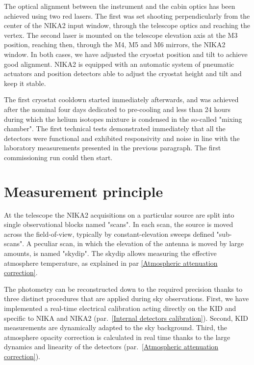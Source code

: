 \documentclass[]{aa} %
\begin{document}
The optical alignment between the instrument and the cabin optics has been
achieved using two red lasers. The first was set shooting perpendicularly from
the center of the NIKA2 input window, through the telescope optics and reaching
the vertex. The second laser is mounted on the telescope elevation axis at the
M3 position, reaching then, through the M4, M5 and M6 mirrors, the NIKA2
window. In both cases, we have adjusted the cryostat position and tilt to
achieve good alignment. NIKA2 is equipped with an automatic system of pneumatic
actuators and position detectors able to adjust the cryostat height and tilt and
keep it stable.

The first cryostat cooldown started immediately afterwards, and was achieved
after the nominal four days dedicated to pre-cooling and less than 24 hours
during which the helium isotopes mixture is condensed in the so-called "mixing
chamber". The first technical tests demonstrated immediately that all the
detectors were functional and exhibited responsivity and noise in line with the
laboratory measurements presented in the previous paragraph. The first
commissioning run could then start.







\section{Measurement principle}

At the telescope the NIKA2 acquisitions on a particular source are split into
single observational blocks named "scans". In each scan, the source is moved
across the field-of-view, typically by constant-elevation sweeps defined
"sub-scans". A peculiar scan, in which the elevation of the antenna is moved by
large amounts, is named "skydip". The skydip allows measuring the effective
atmosphere temperature, as explained in par \ref{Atmospheric attenuation
  correction}.

The photometry can be reconstructed down to the required precision thanks to
three distinct procedures that are applied during sky observations. First, we
have implemented a real-time electrical calibration acting directly on the KID
and specific to NIKA and NIKA2 (par.~\ref{Internal detectors
  calibration}). Second, KID measurements are dynamically adapted to the sky
background. Third, the atmosphere opacity correction is calculated in real time
thanks to the large dynamics and linearity of the detectors
(par.~\ref{Atmospheric attenuation correction}).
\end{document}
